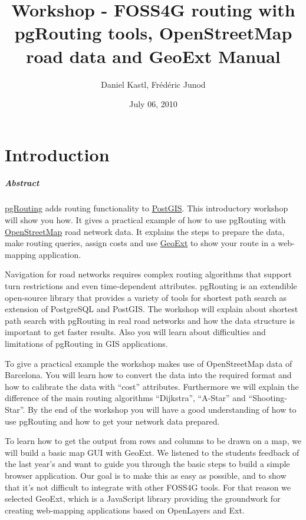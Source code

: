 \documentclass[a4paper,10pt,english]{manual}
\title{Workshop - FOSS4G routing with pgRouting tools, OpenStreetMap road data and GeoExt Manual}
\date{July 06, 2010}
\author{Daniel Kastl, Frédéric Junod}
\begin{document}
\maketitle
\tableofcontents
\hypertarget{--doc-latex}{}


\resetcurrentobjects
\hypertarget{--doc-chapters/introduction}{}

\chapter{Introduction}
\paragraph{Abstract}

\href{http://www.pgrouting.org}{pgRouting} adds routing functionality to \href{http://www.postgis.org}{PostGIS}. This introductory workshop will show you how. It gives a practical example of how to use pgRouting with \href{http://www.openstreetmap.org}{OpenStreetMap} road network data. It explains the steps to prepare the data, make routing queries, assign costs and use \href{http://www.geoext.org}{GeoExt} to show your route in a web-mapping application.

Navigation for road networks requires complex routing algorithms that support turn restrictions and even time-dependent attributes. pgRouting is an extendible open-source library that provides a variety of tools for shortest path search as extension of PostgreSQL and PostGIS. The workshop will explain about shortest path search with pgRouting in real road networks and how the data structure is important to get faster results. Also you will learn about difficulties and limitations of pgRouting in GIS applications.

To give a practical example the workshop makes use of OpenStreetMap data of Barcelona. You will learn how to convert the data into the required format and how to calibrate the data with ``cost'' attributes. Furthermore we will explain the difference of the main routing algorithms ``Dijkstra'', ``A-Star'' and ``Shooting-Star''. By the end of the workshop you will have a good understanding of how to use pgRouting and how to get your network data prepared.

To learn how to get the output from rows and columns to be drawn on a map, we will build a basic map GUI with GeoExt. We listened to the students feedback of the last year's and want to guide you through the basic steps to build a simple browser application. Our goal is to make this as easy as possible, and to show that it's not difficult to integrate with other FOSS4G tools. For that reason we selected GeoExt, which is a JavaScript library providing the groundwork for creating web-mapping applications based on OpenLayers and Ext.
\end{document}
